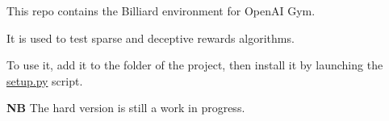 This repo contains the Billiard environment for Open\+AI Gym.

It is used to test sparse and deceptive rewards algorithms.

To use it, add it to the folder of the project, then install it by launching the {\ttfamily \mbox{\hyperlink{setup_8py}{setup.\+py}}} script.

{\bfseries{NB}} The hard version is still a work in progress. 